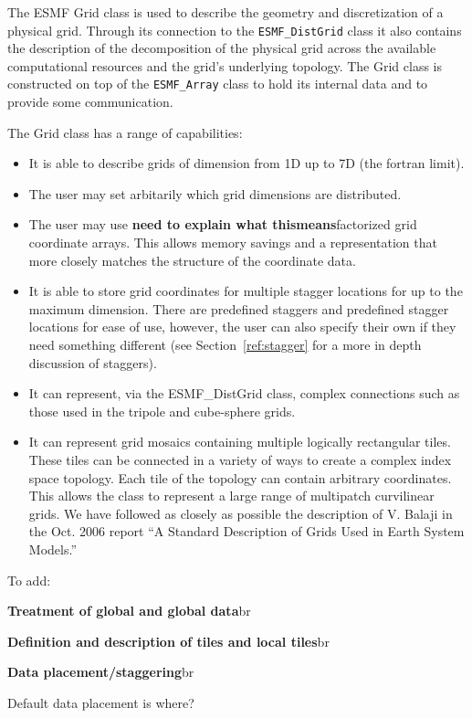 %



The ESMF Grid class is used to describe the geometry and discretization
of a physical grid.  Through its connection to the {\tt ESMF\_DistGrid}
class it also contains the description of the decomposition of the 
physical grid across the available computational resources and the grid's
underlying topology. The Grid class is constructed on top of the 
{\tt ESMF\_Array} class to hold its internal data and to provide
some communication. 

\medskip

The Grid class has a range of capabilities:
\begin{itemize}

\item It is able to describe grids of dimension from 1D up to 7D (the fortran limit).

\item The user may set arbitarily which grid dimensions are distributed. 

\item The user may use {\bf need to explain what thismeans}factorized grid coordinate arrays. This allows
      memory savings and a representation that more closely matches 
      the structure of the  coordinate data. 

\item  It is able to store grid coordinates for multiple stagger locations for up to the maximum dimension. There are predefined staggers and predefined stagger locations for ease of use, however, the user can also specify their own if they need something different (see Section~\ref{ref:stagger} for a more in depth discussion of staggers).

\item It can represent, via the ESMF\_DistGrid class, complex connections such 
      as those used in the tripole and cube-sphere grids. 

\item It can represent grid mosaics containing multiple logically rectangular
tiles. These tiles can be connected in a variety of ways to create a complex index space topology. Each tile of the topology can contain arbitrary coordinates. This allows the class to represent a large range of multipatch curvilinear grids. We have followed as closely as possible the description of V. Balaji in the Oct. 2006 report ``A Standard Description of Grids Used in Earth System Models.'' 


\end{itemize}

To add:

{\bf Treatment of global and global data}{br}
 
{\bf Definition and description of tiles and local tiles}{br}

{\bf Data placement/staggering}{br}

Default data placement is where?


